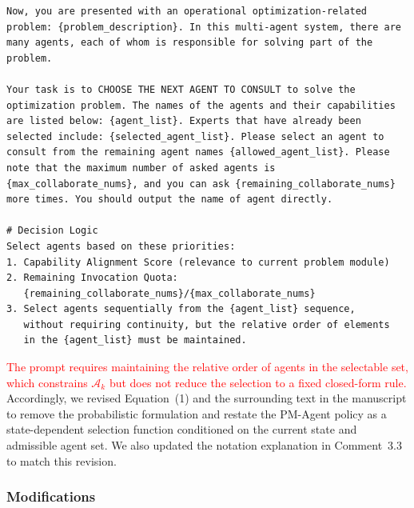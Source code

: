 \documentclass[11pt,a4paper]{article}
\begin{document}
\begin{promptbox}
\begin{lstlisting}[style=prompttemplate]
Now, you are presented with an operational optimization-related problem: {problem_description}. In this multi-agent system, there are many agents, each of whom is responsible for solving part of the problem.

Your task is to CHOOSE THE NEXT AGENT TO CONSULT to solve the optimization problem. The names of the agents and their capabilities are listed below: {agent_list}. Experts that have already been selected include: {selected_agent_list}. Please select an agent to consult from the remaining agent names {allowed_agent_list}. Please note that the maximum number of asked agents is {max_collaborate_nums}, and you can ask {remaining_collaborate_nums} more times. You should output the name of agent directly.

# Decision Logic
Select agents based on these priorities:
1. Capability Alignment Score (relevance to current problem module)
2. Remaining Invocation Quota:
   {remaining_collaborate_nums}/{max_collaborate_nums}
3. Select agents sequentially from the {agent_list} sequence,
   without requiring continuity, but the relative order of elements
   in the {agent_list} must be maintained.
\end{lstlisting}
\end{promptbox}

\textcolor{red}{The prompt requires maintaining the relative order of agents in the selectable set, which constrains $\mathcal{A}_k$ but does not reduce the selection to a fixed closed-form rule.} Accordingly, we revised Equation~(1) and the surrounding text in the manuscript to remove the probabilistic formulation and restate the PM-Agent policy as a state-dependent selection function conditioned on the current state and admissible agent set. We also updated the notation explanation in Comment~3.3 to match this revision.

\subsubsection{Modifications}
\end{document}
